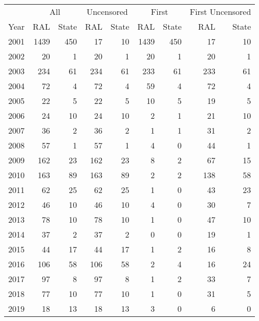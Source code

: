 
\begin{tabular}{rrrrrrrrr}
\toprule
\multicolumn{1}{c}{ } & \multicolumn{2}{c}{All} & \multicolumn{2}{c}{Uncensored} & \multicolumn{2}{c}{First} & \multicolumn{2}{c}{First Uncensored} \\
\cmidrule(l{3pt}r{3pt}){2-3} \cmidrule(l{3pt}r{3pt}){4-5} \cmidrule(l{3pt}r{3pt}){6-7} \cmidrule(l{3pt}r{3pt}){8-9}
Year & RAL & State & RAL & State & RAL & State & RAL & State\\
\midrule
2001 & 1439 & 450 & 17 & 10 & 1439 & 450 & 17 & 10\\
2002 & 20 & 1 & 20 & 1 & 20 & 1 & 20 & 1\\
2003 & 234 & 61 & 234 & 61 & 233 & 61 & 233 & 61\\
2004 & 72 & 4 & 72 & 4 & 59 & 4 & 72 & 4\\
2005 & 22 & 5 & 22 & 5 & 10 & 5 & 19 & 5\\
2006 & 24 & 10 & 24 & 10 & 2 & 1 & 21 & 10\\
2007 & 36 & 2 & 36 & 2 & 1 & 1 & 31 & 2\\
2008 & 57 & 1 & 57 & 1 & 4 & 0 & 44 & 1\\
2009 & 162 & 23 & 162 & 23 & 8 & 2 & 67 & 15\\
2010 & 163 & 89 & 163 & 89 & 2 & 2 & 138 & 58\\
2011 & 62 & 25 & 62 & 25 & 1 & 0 & 43 & 23\\
2012 & 46 & 10 & 46 & 10 & 4 & 0 & 30 & 7\\
2013 & 78 & 10 & 78 & 10 & 1 & 0 & 47 & 10\\
2014 & 37 & 2 & 37 & 2 & 0 & 0 & 19 & 1\\
2015 & 44 & 17 & 44 & 17 & 1 & 2 & 16 & 8\\
2016 & 106 & 58 & 106 & 58 & 2 & 4 & 16 & 24\\
2017 & 97 & 8 & 97 & 8 & 1 & 2 & 33 & 7\\
2018 & 77 & 10 & 77 & 10 & 1 & 0 & 31 & 5\\
2019 & 18 & 13 & 18 & 13 & 3 & 0 & 6 & 0\\
\bottomrule
\end{tabular}

